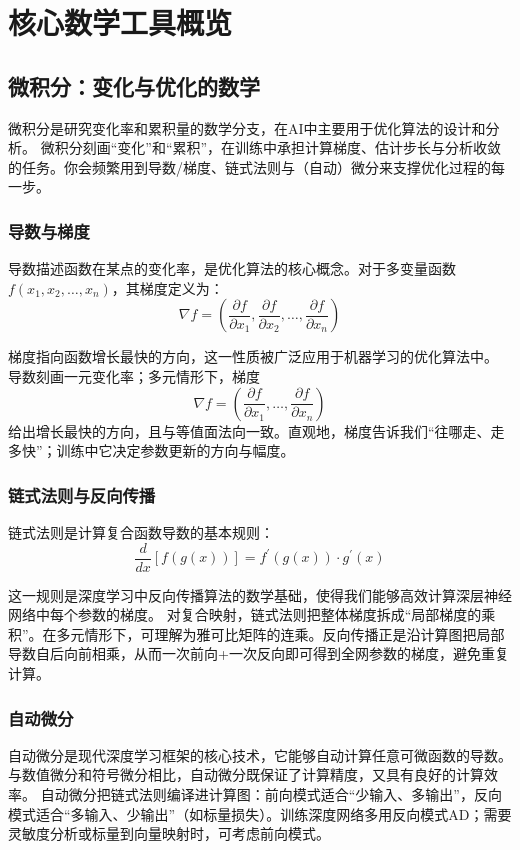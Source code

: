 \section{核心数学工具概览}

\subsection{微积分：变化与优化的数学}

微积分是研究变化率和累积量的数学分支，在AI中主要用于优化算法的设计和分析。
微积分刻画“变化”和“累积”，在训练中承担计算梯度、估计步长与分析收敛的任务。你会频繁用到导数/梯度、链式法则与（自动）微分来支撑优化过程的每一步。

\subsubsection{导数与梯度}
导数描述函数在某点的变化率，是优化算法的核心概念。对于多变量函数$f(x_1, x_2, \ldots, x_n)$，其梯度定义为：
$$
\nabla f = \left(\frac{\partial f}{\partial x_1}, \frac{\partial f}{\partial x_2}, \ldots, \frac{\partial f}{\partial x_n}\right)$$

梯度指向函数增长最快的方向，这一性质被广泛应用于机器学习的优化算法中。
导数刻画一元变化率；多元情形下，梯度
$$
\nabla f = \left(\frac{\partial f}{\partial x_1}, \ldots, \frac{\partial f}{\partial x_n}\right)
$$
给出增长最快的方向，且与等值面法向一致。直观地，梯度告诉我们“往哪走、走多快”；训练中它决定参数更新的方向与幅度。

\subsubsection{链式法则与反向传播}
链式法则是计算复合函数导数的基本规则：
$$\frac{d}{dx}[f(g(x))] = f^\prime(g(x)) \cdot g^\prime(x)$$

这一规则是深度学习中反向传播算法的数学基础，使得我们能够高效计算深层神经网络中每个参数的梯度。
对复合映射，链式法则把整体梯度拆成“局部梯度的乘积”。在多元情形下，可理解为雅可比矩阵的连乘。反向传播正是沿计算图把局部导数自后向前相乘，从而一次前向+一次反向即可得到全网参数的梯度，避免重复计算。

\subsubsection{自动微分}
自动微分是现代深度学习框架的核心技术，它能够自动计算任意可微函数的导数。与数值微分和符号微分相比，自动微分既保证了计算精度，又具有良好的计算效率。
自动微分把链式法则编译进计算图：前向模式适合“少输入、多输出”，反向模式适合“多输入、少输出”（如标量损失）。训练深度网络多用反向模式AD；需要灵敏度分析或标量到向量映射时，可考虑前向模式。

